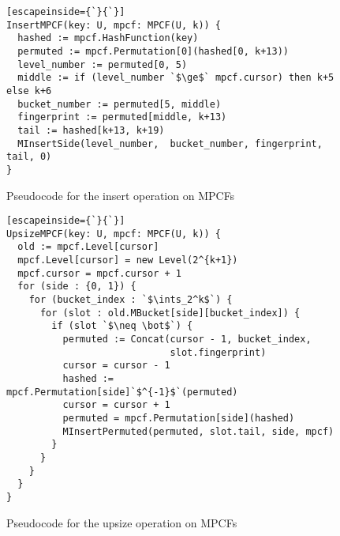 \documentclass[letterpaper, 11pt]{article}
\newcommand{\ints}{\mathbb{Z}}
\begin{document}
\begin{figure}
\begin{lstlisting}[escapeinside={`}{`}]
InsertMPCF(key: U, mpcf: MPCF(U, k)) {
  hashed := mpcf.HashFunction(key)
  permuted := mpcf.Permutation[0](hashed[0, k+13))
  level_number := permuted[0, 5)
  middle := if (level_number `$\ge$` mpcf.cursor) then k+5 else k+6
  bucket_number := permuted[5, middle)
  fingerprint := permuted[middle, k+13)
  tail := hashed[k+13, k+19)
  MInsertSide(level_number,  bucket_number, fingerprint, tail, 0)
}
\end{lstlisting}
\caption{Pseudocode for the insert operation on MPCFs}
\end{figure}

\begin{figure}
\begin{lstlisting}[escapeinside={`}{`}]
UpsizeMPCF(key: U, mpcf: MPCF(U, k)) {
  old := mpcf.Level[cursor]
  mpcf.Level[cursor] = new Level(2^{k+1})
  mpcf.cursor = mpcf.cursor + 1
  for (side : {0, 1}) {
    for (bucket_index : `$\ints_2^k$`) {
      for (slot : old.MBucket[side][bucket_index]) {
        if (slot `$\neq \bot$`) {
          permuted := Concat(cursor - 1, bucket_index,
                             slot.fingerprint)
          cursor = cursor - 1
          hashed := mpcf.Permutation[side]`$^{-1}$`(permuted)
          cursor = cursor + 1
          permuted = mpcf.Permutation[side](hashed)
          MInsertPermuted(permuted, slot.tail, side, mpcf)
        }
      }
    }
  }
}
\end{lstlisting}
\caption{Pseudocode for the upsize operation on MPCFs}
\end{figure}
\end{document}

